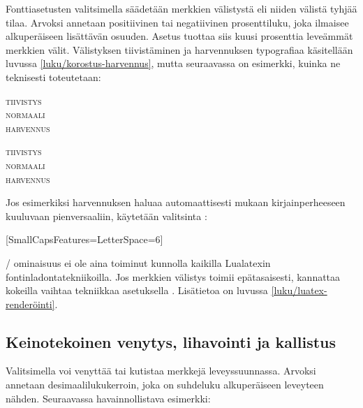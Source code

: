 Fonttiasetusten valitsimella  säädetään merkkien
välistystä eli niiden välistä tyhjää tilaa. Arvoksi annetaan
positiivinen tai negatiivinen prosenttiluku, joka ilmaisee alkuperäiseen
lisättävän osuuden. Asetus  tuottaa siis
kuusi prosenttia leveämmät merkkien välit. Välistyksen tiivistäminen ja
harvennuksen typografiaa käsitellään luvussa
\ref{luku/korostus-harvennus}, mutta seuraavassa on esimerkki, kuinka ne
teknisesti toteutetaan:

\begin{koodilohkosis}
\scshape { tiivistys} \\
normaali \\ { harvennus}
\end{koodilohkosis}

\begin{tulossis}
  \scshape { tiivistys} \\
  normaali \\ { harvennus}
\end{tulossis}

\noindent
Jos esimerkiksi harvennuksen haluaa automaattisesti mukaan
kirjainperheeseen kuuluvaan pienversaaliin, käytetään valitsinta
:

\begin{koodilohkosis}
\setmainfont{…}[SmallCapsFeatures={LetterSpace=6}]
\end{koodilohkosis}

\noindent
{}\-/ ominaisuus ei ole aina toiminut kunnolla
kaikilla Lualatexin fontinladontatekniikoilla. Jos merkkien välistys
toimii epätasaisesti, kannattaa kokeilla vaihtaa tekniikkaa asetuksella
. Lisätietoa on luvussa
\ref{luku/luatex-renderöinti}.

\subsection{Keinotekoinen venytys, lihavointi ja kallistus}
\label{luku/fontit-venytys}

Valitsimella  voi venyttää tai kutistaa merkkejä
leveyssuunnassa. Arvoksi annetaan desimaalilukukerroin, joka on
suhdeluku alkuperäiseen leveyteen nähden. Seuraavassa havainnollistava
esimerkki:

